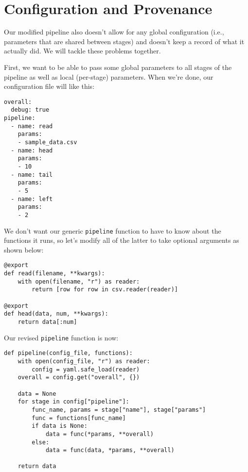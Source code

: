 \documentclass{scrbook}
\begin{document}
\section{Configuration and Provenance}\label{pipeline-provenance}


Our modified pipeline also doesn't allow for any global configuration
(i.e., parameters that are shared between stages)
and doesn't keep a record of what it actually did.
We will tackle these problems together.


First,
we want to be able to pass some global parameters to all stages of the pipeline
as well as local (per-stage) parameters.
When we're done,
our configuration file will like this:


\begin{lstlisting}[frame=single,frameround=tttt]
overall:
  debug: true
pipeline:
  - name: read
    params:
    - sample_data.csv
  - name: head
    params:
    - 10
  - name: tail
    params:
    - 5
  - name: left
    params:
    - 2
\end{lstlisting}



We don't want our generic \texttt{pipeline} function
to have to know about the functions it runs,
so let's modify all of the latter to take optional arguments
as shown below:


\begin{lstlisting}[frame=single,frameround=tttt]
@export
def read(filename, **kwargs):
    with open(filename, "r") as reader:
        return [row for row in csv.reader(reader)]

@export
def head(data, num, **kwargs):
    return data[:num]
\end{lstlisting}



Our revised \texttt{pipeline} function is now:


\begin{lstlisting}[frame=single,frameround=tttt]
def pipeline(config_file, functions):
    with open(config_file, "r") as reader:
        config = yaml.safe_load(reader)
    overall = config.get("overall", {})

    data = None
    for stage in config["pipeline"]:
        func_name, params = stage["name"], stage["params"]
        func = functions[func_name]
        if data is None:
            data = func(*params, **overall)
        else:
            data = func(data, *params, **overall)

    return data
\end{lstlisting}
\end{document}
